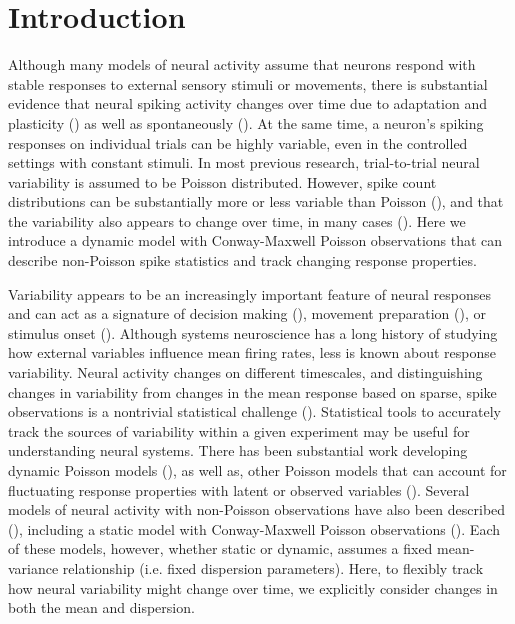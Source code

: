 \documentclass[aoas]{imsart}
\theoremstyle{plain}
\theoremstyle{remark}
\begin{document}

\section{Introduction}
Although many models of neural activity assume that neurons respond with stable responses to external sensory stimuli or movements, there is substantial evidence that neural spiking activity changes over time due to adaptation and plasticity (\cite{Brown2001,Lesica2007}) as well as spontaneously (\cite{Rokni2007,Tomko1974}). At the same time, a neuron’s spiking responses on individual trials can be highly variable, even in the controlled settings with constant stimuli. In most previous research, trial-to-trial neural variability is assumed to be Poisson distributed. However, spike count distributions can be substantially more or less variable than Poisson (\cite{Maimon2009,Amarasingham2006,DeWeese2003,Kara2000}), and that the variability also appears to change over time, in many cases (\cite{Churchland2010,Churchland2011}). Here we introduce a dynamic model with Conway-Maxwell Poisson observations that can describe non-Poisson spike statistics and track changing response properties.

Variability appears to be an increasingly important feature of neural responses and can act as a signature of decision making (\cite{Churchland2011}), movement preparation (\cite{Churchland2006}), or stimulus onset (\cite{Churchland2010}). Although systems neuroscience has a long history of studying how external variables influence mean firing rates, less is known about response variability. Neural activity changes on different timescales, and distinguishing changes in variability from changes in the mean response based on sparse, spike observations is a nontrivial statistical challenge (\cite{DeWeese1998}). Statistical tools to accurately track the sources of variability within a given experiment may be useful for understanding neural systems. There has been substantial work developing dynamic Poisson models (\cite{Brown2001,Eden2004}), as well as, other Poisson models that can account for fluctuating response properties with latent or observed variables (\cite{Czanner2008,Smith2003}). Several models of neural activity with non-Poisson observations have also been described (\cite{DeWeese2003,Gao2015,Pillow2012}), including a static model with Conway-Maxwell Poisson observations (\cite{Stevenson2016}). Each of these models, however, whether static or dynamic, assumes a fixed mean-variance relationship (i.e. fixed dispersion parameters). Here, to flexibly track how neural variability might change over time, we explicitly consider changes in both the mean and dispersion.
\end{document}

